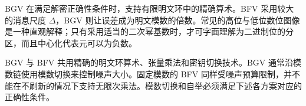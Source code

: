 BGV 在满足解密正确性条件时，支持有限明文环中的精确算术。BFV 采用较大的消息尺度 $\Delta$，BGV 则让误差成为明文模数的倍数。常见的高位与低位数位图像是一种直观解释；只有采用适当的二次幂基数时，才可字面理解为二进制位的分区，而且中心化代表元可以为负数。

BGV 与 BFV 共用精确的明文环算术、张量乘法和密钥切换技术。BGV 通常沿模数链使用模数切换来控制噪声大小。固定模数的 BFV 同样受噪声预算限制，并不能在不刷新的情况下支持无限次乘法。模数切换和自举必须满足下述各方案对应的正确性条件。



\begin{tcolorbox}[
    title = \textbf{所需背景知识},    %
    colback = white,    %
    colframe = black,  %
    boxrule = 0.8pt,     %
    left = 1mm, right = 1mm, top = 1mm, bottom = 1mm %
]


\end{tcolorbox}
